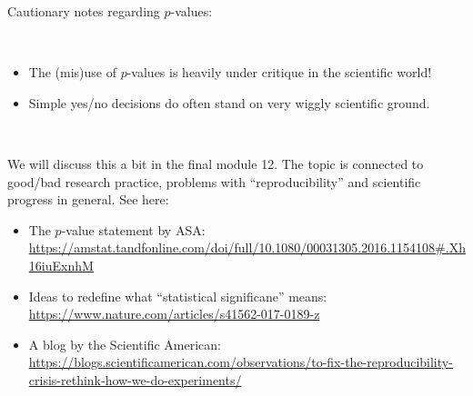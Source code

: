 \documentclass[10pt,ignorenonframetext,]{beamer}
\providecommand{\tightlist}{%
  \setlength{\itemsep}{0pt}\setlength{\parskip}{0pt}}
\begin{document}
\begin{frame}

\begin{block}{Cautionary notes regarding \(p\)-values:}

\(~\)

\begin{itemize}
\item
  The (mis)use of \(p\)-values is heavily under critique in the
  scientific world!
\item
  Simple yes/no decisions do often stand on very wiggly scientific
  ground.
\end{itemize}

\vspace{2mm} \(~\)

We will discuss this a bit in the final module 12. The topic is
connected to good/bad research practice, problems with
``reproducibility'' and scientific progress in general. See here:

\begin{itemize}
\tightlist
\item
  The \(p\)-value statement by ASA:
  \url{https://amstat.tandfonline.com/doi/full/10.1080/00031305.2016.1154108\#.Xh16iuExnhM}
\item
  Ideas to redefine what ``statistical significane'' means:
  \url{https://www.nature.com/articles/s41562-017-0189-z}
\item
  A blog by the Scientific American:
  \url{https://blogs.scientificamerican.com/observations/to-fix-the-reproducibility-crisis-rethink-how-we-do-experiments/}
\end{itemize}

\end{block}

\end{frame}
\end{document}

